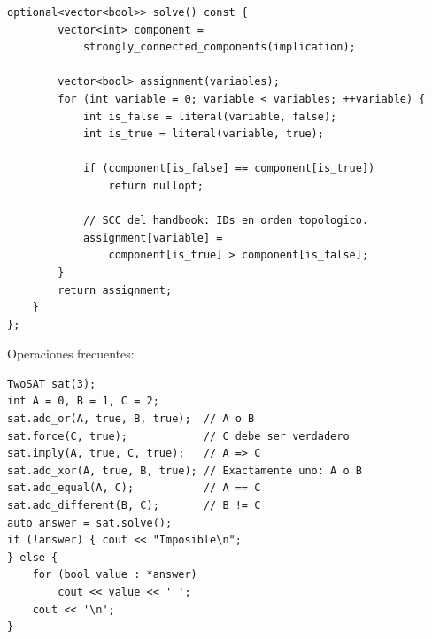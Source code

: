 \begin{lstlisting}[style=cpp]
    optional<vector<bool>> solve() const {
        vector<int> component =
            strongly_connected_components(implication);

        vector<bool> assignment(variables);
        for (int variable = 0; variable < variables; ++variable) {
            int is_false = literal(variable, false);
            int is_true = literal(variable, true);

            if (component[is_false] == component[is_true])
                return nullopt;

            // SCC del handbook: IDs en orden topologico.
            assignment[variable] =
                component[is_true] > component[is_false];
        }
        return assignment;
    }
};
\end{lstlisting}

Operaciones frecuentes:

\begin{lstlisting}[style=cpp]
TwoSAT sat(3);
int A = 0, B = 1, C = 2;
sat.add_or(A, true, B, true);  // A o B
sat.force(C, true);            // C debe ser verdadero
sat.imply(A, true, C, true);   // A => C
sat.add_xor(A, true, B, true); // Exactamente uno: A o B
sat.add_equal(A, C);           // A == C
sat.add_different(B, C);       // B != C
auto answer = sat.solve();
if (!answer) { cout << "Imposible\n";
} else {
    for (bool value : *answer)
        cout << value << ' ';
    cout << '\n';
}
\end{lstlisting}

